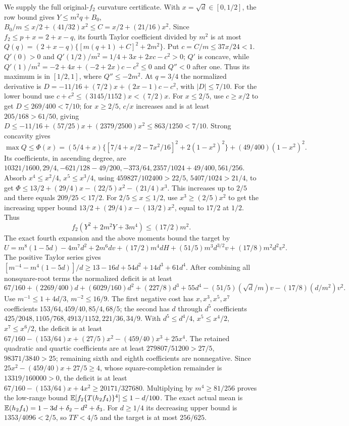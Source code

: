 We supply the full original-$f_2$ curvature certificate.
With $x=\sqrt d\in[0,1/2]$, the row bound gives
$Y\le m^2q+B_0$, $B_0/m\le x/2+(41/32)x^2
\le C=x/2+(21/16)x^2$.
Since $f_2\le p+x=2+x-q$, its fourth Taylor coefficient divided
by $m^2$ is at most
$Q(q)=(2+x-q)\{[m(q+1)+C]^2+2m^2\}$.
Put $c=C/m\le37x/24<1$.
$Q'(0)>0$ and $Q'(1/2)/m^2=1/4+3x+2xc-c^2>0$;
$Q'$ is concave, while
$Q'(1)/m^2=-2+4x+(-2+2x)c-c^2\le0$ and $Q''<0$ after one.
Thus its maximum is in $[1/2,1]$, where $Q''\le-2m^2$.
At $q=3/4$ the normalized derivative is
$D=-11/16+(7/2)x+(2x-1)c-c^2$, with $|D|\le7/10$.
For the lower bound use $c+c^2\le(3145/1152)x<(7/2)x$.
For $x\le2/5$, use $c\ge x/2$ to get
$D\le269/400<7/10$; for $x\ge2/5$, $c/x$ increases and is
at least $205/168>61/50$, giving
$D\le-11/16+(57/25)x+(2379/2500)x^2\le863/1250<7/10$.
Strong concavity gives
\[
\max Q\le\Phi(x)=(5/4+x)
\{[7/4+x/2-7x^2/16]^2+2(1-x^2)^2\}
+(49/400)(1-x^2)^2.
\]
Its coefficients, in ascending degree, are
$10321/1600,\allowbreak 29/4,\allowbreak -621/128-49/200,\allowbreak -373/64,\allowbreak 
2357/1024+49/400,\allowbreak 561/256$.
Absorb $x^4\le x^2/4$, $x^5\le x^3/4$, using
$459827/102400>22/5$, $5407/1024>21/4$, to get
$\Phi\le13/2+(29/4)x-(22/5)x^2-(21/4)x^3$.
This increases up to $2/5$ and there equals $209/25<17/2$.
For $2/5\le x\le1/2$, use $x^3\ge(2/5)x^2$ to get the increasing
upper bound $13/2+(29/4)x-(13/2)x^2$, equal to $17/2$ at $1/2$.
Thus
\begin{equation}\tag{L69.10.5}\label{eq:L69:fourcurvature}
f_2(Y^2+2m^2Y+3m^4)\le(17/2)m^2.
\end{equation}
The exact fourth expansion and the above moments bound the target by
\[
U=m^8(1-5d)-4m^7d^2+2m^6dv+(17/2)m^4dH
+(51/5)m^3d^{3/2}v+(17/8)m^2d^2v^2.
\]
The positive Taylor series gives
$[m^{-4}-m^4(1-5d)]/d\ge13-16d+54d^2+14d^3+61d^4$.
After combining all nonsquare-root terms the normalized deficit is
at least
\[
67/160+(2269/400)d+(6029/160)d^2+(227/8)d^3+55d^4
-(51/5)(\sqrt d/m)v-(17/8)(d/m^2)v^2.
\]
Use $m^{-1}\le1+4d/3$, $m^{-2}\le16/9$.
The first negative cost has $x,x^3,x^5,x^7$ coefficients
$153/64,459/40,85/4,68/5$; the second has $d$ through $d^5$
coefficients $425/2048,\allowbreak 1105/768,\allowbreak 4913/1152,\allowbreak 221/36,\allowbreak 34/9$.
With $d^5\le d^4/4$, $x^5\le x^4/2$, $x^7\le x^6/2$, the
deficit is at least
$67/160-(153/64)x+(27/5)x^2-(459/40)x^3+25x^4$.
The retained quadratic and quartic coefficients are at least
$279807/51200>27/5$, $98371/3840>25$; remaining sixth and eighth
coefficients are nonnegative.
Since $25x^2-(459/40)x+27/5\ge4$, whose square-completion remainder
is $13319/160000>0$, the deficit is at least
$67/160-(153/64)x+4x^2\ge20171/327680$.
Multiplying by $m^4\ge81/256$ proves the low-range bound
$\mathbb E[f_2\{T(h_2f_4)\}^4]\le1-d/100$.
The exact actual mean is
$\mathbb E(h_2f_4)=1-3d+\delta_2-d^2+\delta_3$.
For $d\ge1/4$ its decreasing upper bound is
$1353/4096<2/5$, so $TF<4/5$ and the target is at most $256/625$.

